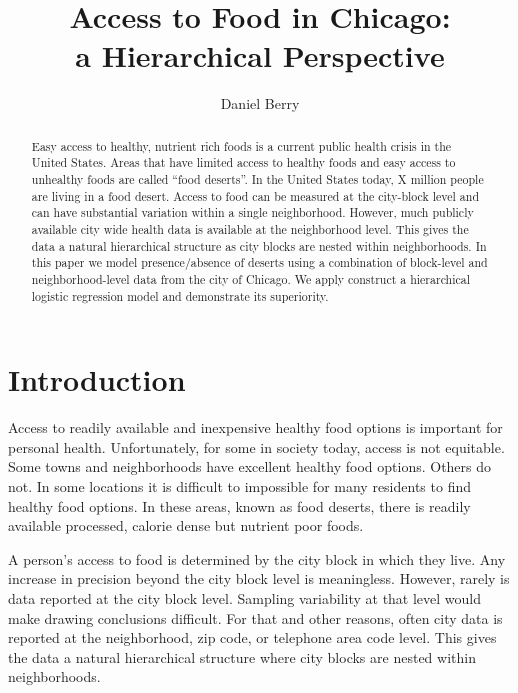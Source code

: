 \documentclass{IEEEtran}
\title{Access to Food in Chicago: \\ a Hierarchical Perspective}
\author{Daniel Berry}
\begin{document}
\maketitle

\begin{abstract}
  Easy access to healthy, nutrient rich foods is a current public health crisis in the United States. Areas that have limited access to healthy foods and easy access to unhealthy foods are called ``food deserts''.  %
  In the United States today, X million people are living in a food desert. %
  Access to food can be measured at the city-block level and can have substantial variation within a single neighborhood. However, much publicly available city wide health data is available at the neighborhood level. This gives the data a natural hierarchical structure as city blocks are nested within neighborhoods. In this paper we model presence/absence of deserts using a combination of block-level and neighborhood-level data from the city of Chicago. We apply construct a hierarchical logistic regression model and demonstrate its superiority. 
\end{abstract}

\section{Introduction}
Access to readily available and inexpensive healthy food options is important for personal health. Unfortunately, for some in society today, access is not equitable. Some towns and neighborhoods have excellent healthy food options. Others do not. In some locations it is difficult to impossible for many residents to find healthy food options. In these areas, known as food deserts, there is readily available processed, calorie dense but nutrient poor foods.

A person's access to food is determined by the city block in which they live. Any increase in precision beyond the city block level is meaningless. However, rarely is data reported at the city block level. Sampling variability at that level would make drawing conclusions difficult. For that and other reasons, often city data is reported at the neighborhood, zip code, or telephone area code level. This gives the data a natural hierarchical structure where city blocks are nested within neighborhoods. 
\end{document}
